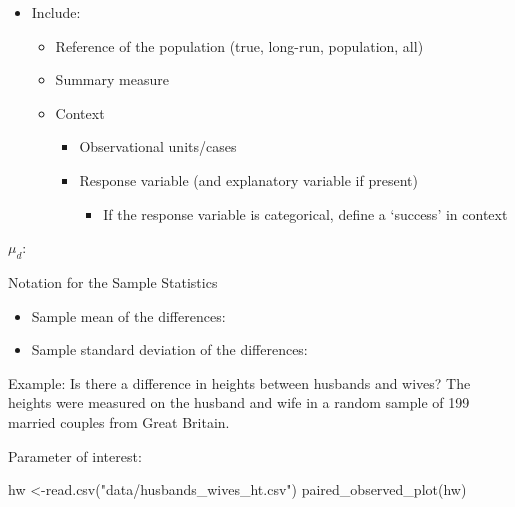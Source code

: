 \documentclass[
]{report}
\newenvironment{Shaded}{\begin{snugshade}}{\end{snugshade}}
\newcommand{\FunctionTok}[1]{\textcolor[rgb]{0.00,0.00,0.00}{#1}}
\newcommand{\NormalTok}[1]{#1}
\newcommand{\OtherTok}[1]{\textcolor[rgb]{0.56,0.35,0.01}{#1}}
\newcommand{\StringTok}[1]{\textcolor[rgb]{0.31,0.60,0.02}{#1}}
\providecommand{\tightlist}{%
  \setlength{\itemsep}{0pt}\setlength{\parskip}{0pt}}
\begin{document}
\begin{itemize}
\item
  Include:

  \begin{itemize}
  \item
    Reference of the population (true, long-run, population, all)
  \item
    Summary measure
  \item
    Context

    \begin{itemize}
    \item
      Observational units/cases
    \item
      Response variable (and explanatory variable if present)

      \begin{itemize}
      \tightlist
      \item
        If the response variable is categorical, define a `success' in context
      \end{itemize}
    \end{itemize}
  \end{itemize}
\end{itemize}

\(\mu_d:\)

\vspace{0.5in}

Notation for the Sample Statistics

\begin{itemize}
\item
  Sample mean of the differences:
\item
  Sample standard deviation of the differences:
\end{itemize}

\newpage

Example: Is there a difference in heights between husbands and wives? The heights were measured on the husband and wife in a random sample of 199 married couples from Great Britain.

Parameter of interest:

\vspace{0.8in}

\begin{Shaded}
\begin{Highlighting}[]
\NormalTok{hw }\OtherTok{\textless{}{-}}\FunctionTok{read.csv}\NormalTok{(}\StringTok{"data/husbands\_wives\_ht.csv"}\NormalTok{)}
\FunctionTok{paired\_observed\_plot}\NormalTok{(hw)}
\end{Highlighting}
\end{Shaded}
\end{document}
